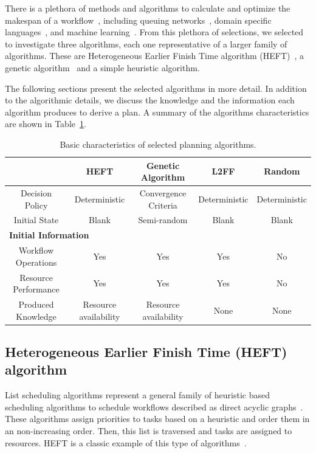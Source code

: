 There is a plethora of methods and algorithms to calculate and optimize the makespan of a workflow~\cite{lu2019review}, including queuing networks~\cite{yao2019throughput,bao2019performance}, domain specific languages~\cite{carothers2017durango,maheshwari2016workflow}, and machine learning~\cite{witt2019predictive,pumma2017runtime}.
From this plethora of selections, we selected to investigate three algorithms, each one representative of a larger family of algorithms.
These are Heterogeneous Earlier Finish Time algorithm (HEFT)~\cite{topcuoglu2002performance}, a genetic algorithm~\cite{page2005algorithm} and a simple heuristic algorithm.

The following sections present the selected algorithms in more detail.
In addition to the algorithmic details, we discuss the knowledge and the information each algorithm produces to derive a plan.
A summary of the algorithms characteristics are shown in Table~\ref{tab:sched_algo}.

\begin{table}[t]
    \centering
    \scriptsize
    \begin{tabular}{@{}ccccc@{}}
        \toprule
        &\textbf{HEFT}     &\textbf{Genetic Algorithm} &\textbf{L2FF} & \textbf{Random} \\
        \midrule
        Decision Policy   &Deterministic &Convergence Criteria &Deterministic& Deterministic\\
        Initial State    &Blank &Semi-random &Blank & Blank\\
        \midrule
        \multicolumn{5}{l}{\textbf{Initial Information}}\\\midrule
        Workflow Operations &Yes & Yes & Yes & No\\
        Resource Performance &Yes &Yes &Yes & No\\
        \midrule
        Produced Knowledge& Resource availability& Resource availability&None&None\\
        \bottomrule
    \end{tabular}
    \caption{Basic characteristics of selected planning algorithms.\label{tab:sched_algo}}
\end{table}

\subsection{Heterogeneous Earlier Finish Time (HEFT) algorithm}
\label{algo:heft}
List scheduling algorithms represent a general family of heuristic based scheduling algorithms to schedule workflows described as direct acyclic graphs~\cite{dong2006scheduling,list_sched_wiki}. 
These algorithms assign priorities to tasks based on a heuristic and order them in an non-increasing order.
Then, this list is traversed and tasks are assigned to resources.
HEFT is a classic example of this type of algorithms~\cite{dong2006scheduling}.

